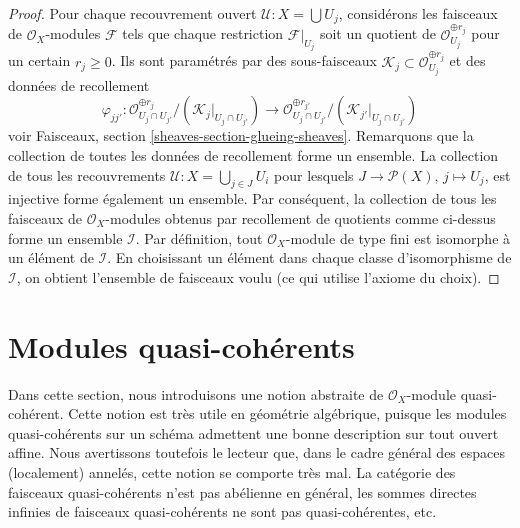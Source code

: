 \begin{proof}
Pour chaque recouvrement ouvert $\mathcal{U} : X = \bigcup U_j$, considérons
les faisceaux de $\mathcal{O}_X$-modules $\mathcal{F}$ tels que chaque
restriction $\mathcal{F}|_{U_j}$ soit un quotient de
$\mathcal{O}_{U_j}^{\oplus r_j}$ pour un certain $r_j \geq 0$. Ils sont
paramétrés par des sous-faisceaux
$\mathcal{K}_j \subset \mathcal{O}_{U_j}^{\oplus r_j}$ et des données de
recollement
$$
\varphi_{jj'} :
\mathcal{O}_{U_j \cap U_{j'}}^{\oplus r_j}/
(\mathcal{K}_j|_{U_j \cap U_{j'}})
\longrightarrow
\mathcal{O}_{U_j \cap U_{j'}}^{\oplus r_{j'}}/
(\mathcal{K}_{j'}|_{U_j \cap U_{j'}})
$$
voir Faisceaux, section \ref{sheaves-section-glueing-sheaves}. Remarquons que
la collection de toutes les données de recollement forme un ensemble. La
collection de tous les recouvrements
$\mathcal{U} : X = \bigcup_{j \in J} U_i$ pour lesquels
$J \to \mathcal{P}(X)$, $j \mapsto U_j$, est injective forme également un
ensemble. Par conséquent, la collection de tous les faisceaux de
$\mathcal{O}_X$-modules obtenus par recollement de quotients comme ci-dessus
forme un ensemble $\mathcal{I}$. Par définition, tout
$\mathcal{O}_X$-module de type fini est isomorphe à un élément de
$\mathcal{I}$. En choisissant un élément dans chaque classe d'isomorphisme de
$\mathcal{I}$, on obtient l'ensemble de faisceaux voulu (ce qui utilise
l'axiome du choix).
\end{proof}













\section{Modules quasi-cohérents}
\label{section-quasi-coherent}

\noindent
Dans cette section, nous introduisons une notion abstraite de
$\mathcal{O}_X$-module quasi-cohérent. Cette notion est très utile en géométrie
algébrique, puisque les modules quasi-cohérents sur un schéma admettent une
bonne description sur tout ouvert affine. Nous avertissons toutefois le
lecteur que, dans le cadre général des espaces (localement) annelés, cette
notion se comporte très mal. La catégorie des faisceaux quasi-cohérents n'est
pas abélienne en général, les sommes directes infinies de faisceaux
quasi-cohérents ne sont pas quasi-cohérentes, etc.

